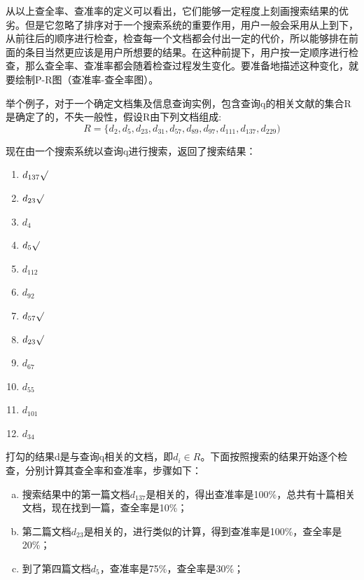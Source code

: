 \documentclass[12pt,a4paper]{article}
\begin{document}
	从以上查全率、查准率的定义可以看出，它们能够一定程度上刻画搜索结果的优劣。但是它忽略了排序对于一个搜索系统的重要作用，用户一般会采用从上到下，从前往后的顺序进行检查，检查每一个文档都会付出一定的代价，所以能够排在前面的条目当然更应该是用户所想要的结果。在这种前提下，用户按一定顺序进行检查，那么查全率、查准率都会随着检查过程发生变化。要准备地描述这种变化，就要绘制{\Times P-R}图（查准率-查全率图）。
	
	举个例子，对于一个确定文档集及信息查询实例，包含查询q的相关文献的集合{\Times R}是确定了的，不失一般性，假设{\Times R}由下列文档组成:
	$$ R = \{d_{2},d_{5},d_{23},d_{31},d_{57},d_{89},d_{97},d_{111},d_{137},d_{229}) $$
	
	现在由一个搜索系统以查询{\Times q}进行搜索，返回了搜索结果：
\begin{multicols}{4}
\begin{enumerate}
\item $d_{137} \surd$
\item $d_{23} \surd$ 
\item $d_{4}$
\item $d_{5} \surd$ 
\item $d_{112}$
\item $d_{92}$
\item $d_{57} \surd$
\item $d_{23} \surd$
\item $d_{67}$
\item $d_{55}$
\item $d_{101}$
\item $d_{34}$
\end{enumerate}
\end{multicols}

	打勾的结果d是与查询q相关的文档，即$d_i \in R$。下面按照搜索的结果开始逐个检查，分别计算其查全率和查准率，步骤如下：
\begin{enumerate}[a)]
\item
搜索结果中的第一篇文档$d_{137}$是相关的，得出查准率是100\%，总共有十篇相关文档，现在找到一篇，查全率是10\%；
\item
第二篇文档$d_{23}$是相关的，进行类似的计算，得到查准率是100\%，查全率是20\%；
\item
到了第四篇文档$d_{5}$，查准率是75\%，查全率是30\%；
\end{enumerate}
\end{document}
